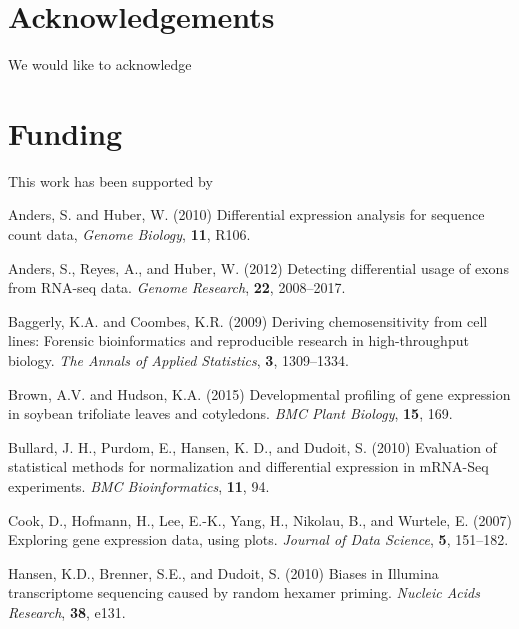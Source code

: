 \documentclass{bioinfo}
\begin{document}
\section*{Acknowledgements}

We would like to acknowledge 

\section*{Funding}

This work has been supported by

\begin{thebibliography}{}


Anders, S. and Huber, W. (2010) Differential expression analysis for sequence count data, {\it Genome Biology}, {\bf 11}, R106.

Anders, S., Reyes, A., and Huber, W. (2012) Detecting differential usage of exons from RNA-seq data. {\it Genome Research}, {\bf 22}, 2008--2017.

Baggerly, K.A. and Coombes, K.R. (2009) Deriving chemosensitivity from cell lines: Forensic bioinformatics and reproducible research in high-throughput biology. {\it The Annals of Applied Statistics}, {\bf 3}, 1309--1334.

Brown, A.V. and Hudson, K.A. (2015) Developmental profiling of gene expression in soybean trifoliate leaves and cotyledons. {\it BMC Plant Biology}, {\bf 15}, 169.

Bullard, J. H., Purdom, E., Hansen, K. D., and Dudoit, S. (2010) Evaluation of statistical methods for normalization and differential expression in mRNA-Seq experiments. {\it BMC Bioinformatics}, {\bf 11}, 94.

Cook, D., Hofmann, H., Lee, E.-K., Yang, H., Nikolau, B., and Wurtele, E. (2007) Exploring gene expression data, using plots. {\it Journal of Data Science}, {\bf 5}, 151--182.

Hansen, K.D., Brenner, S.E., and Dudoit, S. (2010) Biases in Illumina transcriptome sequencing caused by random hexamer priming. {\it Nucleic Acids Research}, {\bf 38}, e131.


\end{thebibliography}
\end{document}
